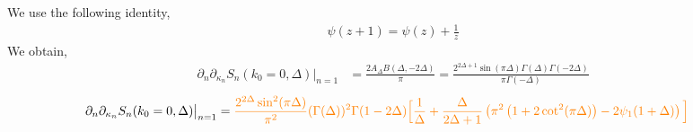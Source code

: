 \documentclass[11pt]{article}
\newcommand{\p}{\partial}
\newcommand{\lb}{\left(}
\newcommand{\rb}{\right)}
\newcommand{\JM}[1]{\textcolor{orange}{#1}}
\begin{document}
We use the following identity,
\begin{align}
    \psi(z+1)= \psi(z) + \frac{1}{z}
\end{align}
We obtain,
\begin{align}
    \p_n \p_{\kappa_n}S_n(k_0 =0,\Delta)\big|_{n=1} &= \frac{2A_\Delta B(\Delta,-2\Delta)}{\pi} = \frac{2^{2\Delta + 1} \sin(\pi \Delta) \Gamma(\Delta) \Gamma(-2\Delta)}{\pi \Gamma(-\Delta)}
\end{align}
\begin{align*}
    \p_n \p_{\kappa_n}S_n(k_0 =0,\Delta)\big|_{n=1} &= \JM{\frac{2^{2\Delta}\sin^2(\pi \Delta)}{\pi^2}(\Gamma(\Delta))^2 \Gamma(1-2\Delta) \Big[ \frac{1}{\Delta} + \frac{\Delta}{2\Delta + 1} \lb \pi^2 \lb1+2\cot^2(\pi\Delta)\rb-2\psi_1(1+\Delta)\rb\Big]}
\end{align*}

\end{document}
